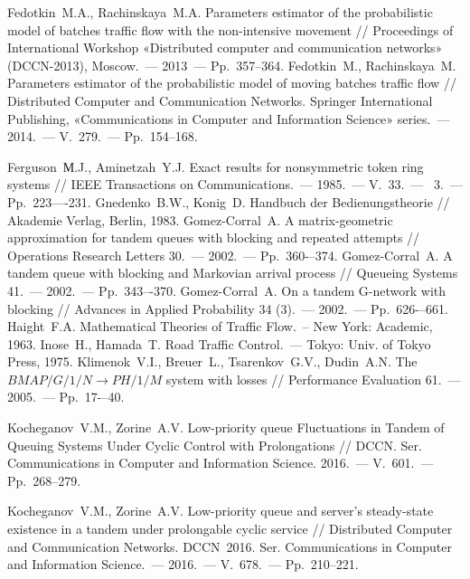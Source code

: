 \documentclass[a4paper,12pt,russian]{extarticle}
\newcommand{\No}{\textnumero}
\begin{document}
\begin{thebibliography}{99}
 Fedotkin~M.A., Rachinskaya~M.A. Parameters estimator of the probabilistic model of batches traffic flow with the non-intensive movement // Proceedings of International Workshop «Distributed computer and communication networks» (DCCN-2013), Moscow.~--- 2013~--- Pp.~357--364.
 Fedotkin~M., Rachinskaya~M. Parameters estimator of the probabilistic model of moving batches traffic flow // Distributed Computer and Communication Networks. Springer International Publishing, «Communications in Computer and Information Science» series.~--- 2014.~--- V.~279.~--- Pp.~154--168.

 Ferguson~М.J., Aminetzah~Y.J. Exact results for nonsymmetric token ring systems // IEEE Transactions on Communications.~--- 1985.~--- V.~33.~--- \No{}~3.~--- Pp.~223—-231.
 Gnedenko~B.W., Konig~D. Handbuch der Bedienungstheorie // Akademie Verlag, Berlin, 1983.
 Gomez-Corral~A. A matrix-geometric approximation for tandem queues with blocking and repeated attempts // Operations Research Letters  30.~--- 2002.~--- Pp.~360-–374.
 Gomez-Corral~A. A tandem queue with blocking and Markovian arrival process // Queueing Systems 41.~--- 2002.~--- Pp.~343–-370. 
 Gomez-Corral~A. On a tandem G-network with blocking // Advances in Applied Probability 34 (3).~--- 2002.~--- Pp.~626-–661.
 Haight~F.A. Mathematical Theories of Traffic Flow.~-- New York: Academic, 1963. 
 Inose~H., Hamada~T. Road Traffic Control.~--- Tokyo: Univ. of Tokyo Press, 1975.
 Klimenok~V.I., Breuer~L., Tsarenkov~G.V., Dudin~A.N. The $BMAP/G/1/N \to PH/1/M$ system with losses // Performance Evaluation 61.~--- 2005.~--- Pp.~17-–40.



 Kocheganov~V.M., Zorine~A.V. Low-priority queue Fluctuations in Tandem of Queuing Systems Under Cyclic Control with Prolongations // DCCN. Ser. Communications in Computer and Information Science. 2016.~--- V.~601.~--- Pp.~268--279.

  Kocheganov~V.M., Zorine~A.V. Low-priority queue and server's steady-state existence in a tandem under prolongable cyclic service // Distributed Computer and Communication Networks. DCCN~2016. Ser. Communications in Computer and Information Science.~--- 2016.~--- V.~678.~--- Pp.~210--221.
 

\end{thebibliography}
\end{document}
